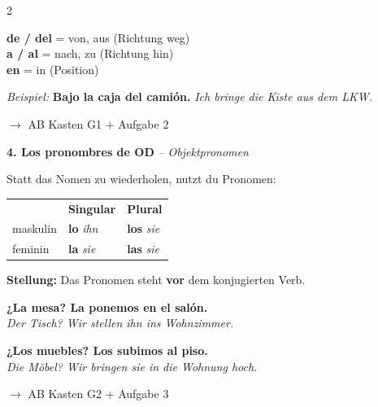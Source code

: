 \documentclass[11pt, a4paper]{article}
\newcommand{\seriftext}[1]{{\fontfamily{ppl}\selectfont #1}}
\newcommand{\es}[1]{\seriftext{\textbf{#1}}}
\newcommand{\de}[1]{\textit{\textcolor{akzent}{#1}}}
\newcommand{\abmark}[1]{{\footnotesize\textcolor{akzent}{$\rightarrow$ AB #1}}}
\newcommand{\abschnitt}[2]{\noindent\textbf{\large #1. #2}}
\begin{document}
\begin{multicols}{2}
\begin{merkbox}
\vspace{3pt}
{\small
\textbf{de / del} = von, aus (Richtung weg)\\
\textbf{a / al} = nach, zu (Richtung hin)\\
\textbf{en} = in (Position)}
\end{merkbox}

\begin{tippbox}
\footnotesize\textit{Beispiel:} \es{Bajo la caja \textbf{del} camión.} \de{Ich bringe die Kiste aus dem LKW.}
\end{tippbox}

\abmark{Kasten G1 + Aufgabe 2}

\vspace{8pt}

\abschnitt{4}{Los pronombres de OD} \de{-- Objektpronomen}

\vspace{4pt}

Statt das Nomen zu wiederholen, nutzt du Pronomen:

\begin{grammatikbox}
{\small
\begin{tabular}{@{}lll@{}}
& \textbf{Singular} & \textbf{Plural} \\[0.3em]
maskulin & \es{lo} \de{ihn} & \es{los} \de{sie} \\[0.3em]
feminin & \es{la} \de{sie} & \es{las} \de{sie} \\
\end{tabular}}
\end{grammatikbox}

\vspace{3pt}

{\small\textbf{Stellung:} Das Pronomen steht \textbf{vor} dem konjugierten Verb.}

\vspace{3pt}

{\footnotesize
\es{¿La mesa? La ponemos en el salón.}\\
\de{Der Tisch? Wir stellen ihn ins Wohnzimmer.}}

\vspace{3pt}

{\footnotesize
\es{¿Los muebles? Los subimos al piso.}\\
\de{Die Möbel? Wir bringen sie in die Wohnung hoch.}}

\abmark{Kasten G2 + Aufgabe 3}

\end{multicols}
\end{document}
